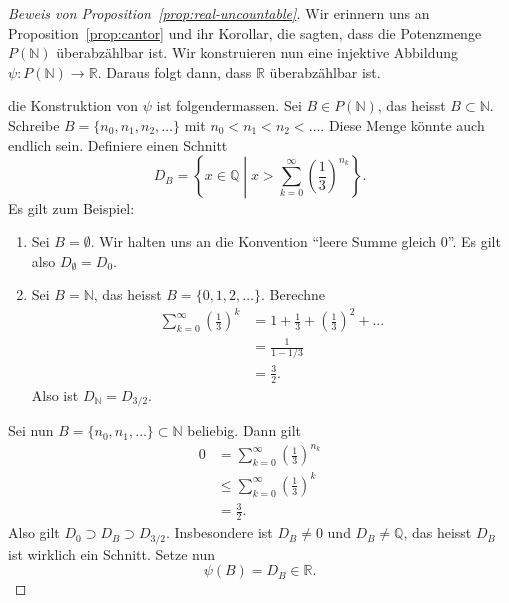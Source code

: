 \documentclass[../main.tex]{subfiles}
\begin{document}
\begin{proof}[Beweis von Proposition~\ref{prop:real-uncountable}]
  Wir erinnern uns an Proposition~\ref{prop:cantor} und ihr Korollar,
  die sagten, dass die Potenzmenge $P(\mathbb N )$ überabzählbar ist.
  Wir konstruieren nun eine injektive Abbildung
  $\psi \colon P(\mathbb N) \to \mathbb R$.
  Daraus folgt dann, dass $\mathbb R$ überabzählbar ist.

  die Konstruktion von $\psi$ ist folgendermassen.
  Sei $B \in P(\mathbb N)$, das heisst $B \subset \mathbb N$.
  Schreibe $B = \{n_{0}, n_{1}, n_{2}, \dots\}$ mit $n_{0} < n_{1} < n_{2} < \dots$.
  Diese Menge könnte auch endlich sein.
  Definiere einen Schnitt
  \[
    D_{B} = \left\{x \in \mathbb Q \middle| x > \sum_{k=0}^{\infty}
      {\left( \frac{1}{3}\right)}^{n_{k}}
    \right\}.
  \]
  Es gilt zum Beispiel:
  \begin{enumerate}[(1)]
    \item Sei $B = \emptyset$.
      Wir halten uns an die Konvention ``leere Summe gleich $0$''. Es gilt also
      $D_{\emptyset} = D_{0}$.
    \item Sei $B = \mathbb N$, das heisst $B = \{0, 1, 2, \dots\}$. Berechne
      \begin{align*}
        \sum_{k=0}^{\infty}
        {\left(\frac{1}{3}\right)}^{k}
        &= 1 + \frac{1}{3} + {\left(\frac{1}{3}\right)}^{2} + \dots \\
        &= \frac{1}{1 - 1/3}
          \\ &= \frac{3}{2}.
      \end{align*}
      Also ist $D_{\mathbb N} = D_{3/2}$.
  \end{enumerate}

Sei nun $B = \{n_{0}, n_{1}, \dots \} \subset \mathbb N$ beliebig.
Dann gilt
\begin{align*}
  0
  &= \sum_{k=0}^{\infty}{\left(\frac{1}{3}\right)}^{n_{k}} \\
  &\leq \sum_{k=0}^{\infty} {\left(\frac{1}{3}\right)}^{k} \\
  &= \frac{3}{2}.
\end{align*}
Also gilt $D_{0} \supset D_{B} \supset D_{3/2}$.
Insbesondere ist $D_{B} \neq 0$ und $D_{B} \neq \mathbb Q$, das heisst
$D_{B}$ ist wirklich ein Schnitt.
Setze nun
\[\psi(B) = D_{B} \in \mathbb R.\]


\end{proof}
\end{document}
